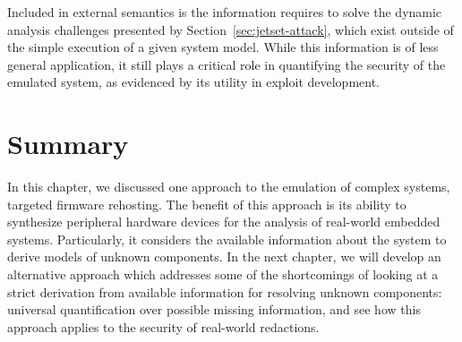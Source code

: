 Included in external semantics is the information requires to solve the dynamic analysis challenges presented by Section~\ref{sec:jetset-attack}, which exist outside of the simple execution of a given system model.
While this information is of less general application, it still plays a critical role in quantifying the security of the emulated system, as evidenced by its utility in exploit development.

\section{Summary}

In this chapter, we discussed one approach to the emulation of complex systems, targeted firmware rehosting.
The benefit of this approach is its ability to synthesize peripheral hardware devices for the analysis of real-world embedded systems.
Particularly, it considers the available information about the system to derive models of unknown components.
In the next chapter, we will develop an alternative approach which addresses some of the shortcomings of looking at a strict derivation from available information for resolving unknown components: universal quantification over possible missing information, and see how this approach applies to the security of real-world redactions.
